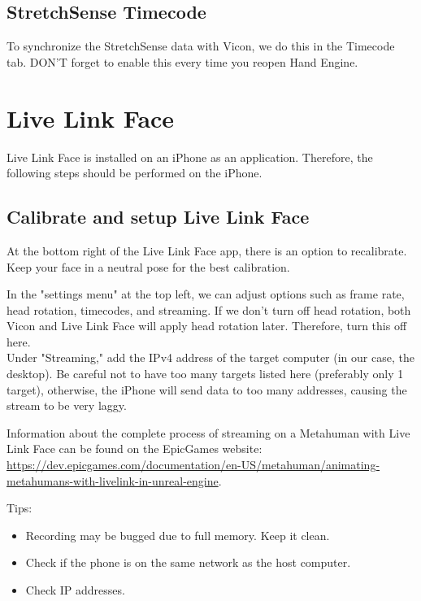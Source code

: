 \documentclass{uva-inf-article}
\begin{document}
\subsection{StretchSense Timecode}
To synchronize the StretchSense data with Vicon, we do this in the Timecode tab. DON'T forget to enable this every time you reopen Hand Engine.


\section{Live Link Face}
Live Link Face is installed on an iPhone as an application. Therefore, the following steps should be performed on the iPhone.

\subsection{Calibrate and setup Live Link Face}
At the bottom right of the Live Link Face app, there is an option to recalibrate. Keep your face in a neutral pose for the best calibration.

In the "settings menu" at the top left, we can adjust options such as frame rate, head rotation, timecodes, and streaming. If we don't turn off head rotation, both Vicon and Live Link Face will apply head rotation later. Therefore, turn this off here.\\
Under "Streaming," add the IPv4 address of the target computer (in our case, the desktop). Be careful not to have too many targets listed here (preferably only 1 target), otherwise, the iPhone will send data to too many addresses, causing the stream to be very laggy.

Information about the complete process of streaming on a Metahuman with Live Link Face can be found on the EpicGames website: \url{https://dev.epicgames.com/documentation/en-US/metahuman/animating-metahumans-with-livelink-in-unreal-engine}.

Tips:
\begin{itemize}
    \item Recording may be bugged due to full memory. Keep it clean.
    \item Check if the phone is on the same network as the host computer.
    \item Check IP addresses.
\end{itemize}
\end{document}
